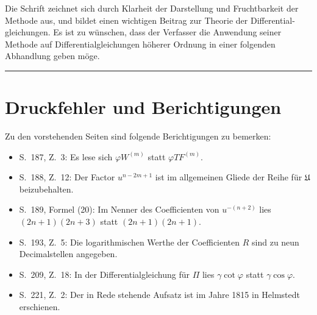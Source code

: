 \documentclass[12pt,a4paper]{article}
\newcommand{\UU}{\mathfrak{U}}
\begin{document}
Die Schrift zeichnet sich durch Klarheit der Darstellung und Fruchtbarkeit
der Methode aus, und bildet einen wichtigen Beitrag zur Theorie der Differential-
gleichungen. Es ist zu wünschen, dass der Verfasser die Anwendung seiner Methode
auf Differentialgleichungen höherer Ordnung in einer folgenden Abhandlung geben
möge.

\vfill
\begin{center}
\rule{0.5\textwidth}{0.4pt}
\end{center}

\section*{Druckfehler und Berichtigungen}

Zu den vorstehenden Seiten sind folgende Berichtigungen zu bemerken:

\begin{itemize}[leftmargin=2em]
\item S.\ 187, Z.\ 3: Es lese sich $\varphi W^{(m)}$ statt $\varphi TF^{(m)}$.
\item S.\ 188, Z.\ 12: Der Factor $u^{n-2m+1}$ ist im allgemeinen Gliede der Reihe
für $\UU$ beizubehalten.
\item S.\ 189, Formel (20): Im Nenner des Coefficienten von $u^{-(n+2)}$ lies
$(2n+1)(2n+3)$ statt $(2n+1)(2n+1)$.
\item S.\ 193, Z.\ 5: Die logarithmischen Werthe der Coefficienten $R$ sind zu
neun Decimalstellen angegeben.
\item S.\ 209, Z.\ 18: In der Differentialgleichung für $\Pi$ lies $\gamma \cot \varphi$
statt $\gamma \cos \varphi$.
\item S.\ 221, Z.\ 2: Der in Rede stehende Aufsatz ist im Jahre 1815 in Helmstedt
erschienen.
\end{itemize}
\end{document}
